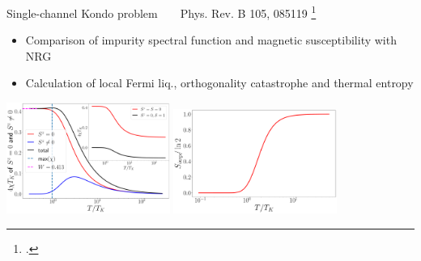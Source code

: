 \documentclass[10pt,aspectratio=169]{beamer}
\begin{document}
\begin{frame}{Single-channel Kondo problem ~ ~ Phys. Rev. B 105, 085119}
\footcite{kondo1964resistance,wilson1975,andreiKondoreview,hewson1993,nozieres1974fermi,anderson1970,tsvelickKondoreview,affleck1993exact,Goldhaber-Gordon1998,Borzenets2020,sakai_osamu_shimizu,costi_hewson_1990,nozaki2012,affleck1995conformal}

\begin{itemize}
	\item Comparison of impurity spectral function and magnetic susceptibility with NRG
\item Calculation of local Fermi liq., orthogonality catastrophe and thermal entropy
\end{itemize}
\vspace*{\fill}

\includegraphics[width=0.4\textwidth]{chi_parts.pdf}
\hspace*{\fill}
\includegraphics[width=0.4\textwidth]{entropy_therm.pdf}

\end{frame}
\end{document}
